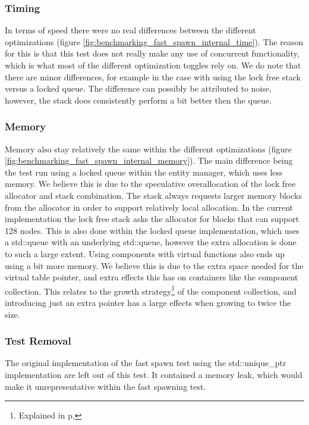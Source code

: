 \subsubsection{Timing}
In terms of speed there were no real differences between the different optimizations (figure \ref{fig:benchmarking_fast_spawn_internal_time}).
The reason for this is that this test does not really make any use of concurrent functionality,
which is what most of the different optimization toggles rely on.
We do note that there are minor differences, for example in the case with using the lock free
stack versus a locked queue. The difference can possibly be attributed to noise, however,
the stack does consistently perform a bit better then the queue.

\subsubsection{Memory}
Memory also stay relatively the same within the different optimizations (figure \ref{fig:benchmarking_fast_spawn_internal_memory}).
The main difference being the test run using a locked queue within the entity manager, which uses less memory.
We believe this is due to the speculative overallocation of the lock free allocator and stack combination.
The stack always requests larger memory blocks from the allocator in order to support relatively local allocation.
In the current implementation the lock free stack asks the allocator for blocks that can support 128 nodes.
This is also done within the locked queue implementation, which uses a std::queue with an underlying std::queue,
however the extra allocation is done to such a large extent.
Using components with virtual functions also ends up using a bit more memory.
We believe this is due to the extra space needed for the virtual table pointer,
and extra effects this has on containers like the component collection.
This relates to the growth strategy\footnote{Explained in p.\pageref{par:detailed_component_collection_reallocation_growth}} of the component collection,
and introducing just an extra pointer has a large effects when growing to twice the size.

\subsubsection{Test Removal}
The original implementation of the fast spawn test using the std::unique\_ptr implementation are left out of this test.
It contained a memory leak, which would make it unrepresentative within the fast spawning test.
